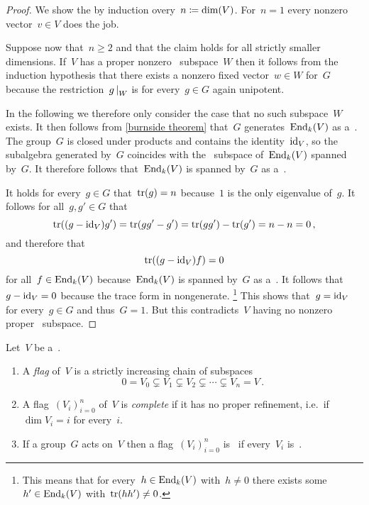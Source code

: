 \begin{proof}
  We show the  by induction overy~$n \coloneqq \dim(V)$.
  For~$n = 1$ every nonzero vector~$v \in V$ does the job.
  
  Suppose now that~$n \geq 2$ and that the claim holds for all strictly smaller dimensions.
  If~$V$ has a proper nonzero~ subspace~$W$ then it follows from the induction hypothesis that there exists a nonzero fixed vector~$w \in W$ for~$G$ because the restriction~$\restrict{g}{W}$ is for every~$g \in G$ again unipotent.
  
  In the following we therefore only consider the case that no such subspace~$W$ exists.
  It then follows from \cref{burnside theorem} that~$G$ generates~$\operatorname{End}_k(V)$ as a~.
  The group~$G$ is closed under products and contains the identity~$\operatorname{id}_V$, so the subalgebra generated by~$G$ coincides with the~ subspace of~$\operatorname{End}_k(V)$ spanned by~$G$.
  It therefore follows that~$\operatorname{End}_k(V)$ is spanned by~$G$ as a~{\kvs}.
  
  It holds for every~$g \in G$ that~$\operatorname{tr}(g) = n$ because~$1$ is the only eigenvalue of~$g$.
  It follows for all~$g, g' \in G$ that
  \[
      \operatorname{tr}((g - \operatorname{id}_V) g')
    = \operatorname{tr}(g g' - g')
    = \operatorname{tr}(g g') - \operatorname{tr}(g')
    = n - n
    = 0 \,,
  \]
  and therefore that
  \[
    \operatorname{tr}((g - \operatorname{id}_V) f) = 0
  \]
  for all~$f \in \operatorname{End}_k(V)$ because~$\operatorname{End}_k(V)$ is spanned by~$G$ as a~{\kvs}.
  It follows that~$g - \operatorname{id}_V = 0$ because the trace form in nongenerate.%
  \footnote{This means that for every~$h \in \operatorname{End}_k(V)$ with~$h \neq 0$ there exists some~$h' \in \operatorname{End}_k(V)$ with~$\operatorname{tr}(hh') \neq 0$.}
  This shows that~$g = \operatorname{id}_V$ for every~$g \in G$ and thus~$G = 1$.
  But this contradicts~$V$ having no nonzero proper~ subspace.
\end{proof}



\begin{definition}
  Let~$V$ be a~{\kvs}.
  \begin{enumerate}
    \item
      A \emph{flag} of~$V$ is a strictly increasing chain of  subspaces
      \[
                    0
        =           V_0
        \subsetneq  V_1
        \subsetneq  V_2
        \subsetneq  \dotsb 
        \subsetneq  V_n
        =           V \,.
      \]
    \item
      A flag~$(V_i)_{i=0}^n$ of~$V$ is \emph{complete} if it has no proper refinement, i.e.\ if~$\dim V_i = i$ for every~$i$.
    \item
      If a group~$G$ acts on~$V$ then a flag~$(V_i)_{i=0}^n$ is~\emph{} if every~$V_i$ is~.
  \end{enumerate}
\end{definition}


